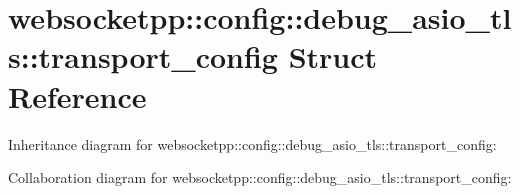 \hypertarget{structwebsocketpp_1_1config_1_1debug__asio__tls_1_1transport__config}{}\section{websocketpp\+:\+:config\+:\+:debug\+\_\+asio\+\_\+tls\+:\+:transport\+\_\+config Struct Reference}
\label{structwebsocketpp_1_1config_1_1debug__asio__tls_1_1transport__config}


Inheritance diagram for websocketpp\+:\+:config\+:\+:debug\+\_\+asio\+\_\+tls\+:\+:transport\+\_\+config\+:


Collaboration diagram for websocketpp\+:\+:config\+:\+:debug\+\_\+asio\+\_\+tls\+:\+:transport\+\_\+config\+:
